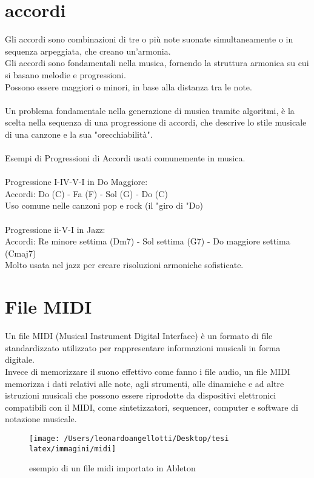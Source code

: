 \documentclass[a4paper,12pt]{report}
\begin{document}
\section{accordi}

Gli accordi sono combinazioni di tre o più note suonate simultaneamente o in sequenza arpeggiata, che creano un'armonia. \\
Gli accordi sono fondamentali nella musica, fornendo la struttura armonica su cui si basano melodie e progressioni. \\
Possono essere maggiori o minori, in base alla distanza tra le note. \\
\\
Un problema fondamentale nella generazione di musica tramite algoritmi, è la scelta nella sequenza di una progressione di accordi, che descrive lo stile musicale di una canzone e la sua "orecchiabilità". \\
\\
Esempi di Progressioni di Accordi usati comunemente in musica.\\
\\
Progressione I-IV-V-I in Do Maggiore: \\
Accordi: Do (C) - Fa (F) - Sol (G) - Do (C) \\
Uso comune nelle canzoni pop e rock (il "giro di "Do) \\
\\
Progressione ii-V-I in Jazz: \\
Accordi: Re minore settima (Dm7) - Sol settima (G7) - Do maggiore settima (Cmaj7) \\
Molto usata nel jazz per creare risoluzioni armoniche sofisticate.

\section{File MIDI}

Un file MIDI (Musical Instrument Digital Interface) è un formato di file standardizzato utilizzato per rappresentare informazioni musicali in forma digitale. \\
Invece di memorizzare il suono effettivo come fanno i file audio, un file MIDI memorizza i dati relativi alle note, agli strumenti, alle dinamiche e ad altre istruzioni musicali che possono essere riprodotte da dispositivi elettronici compatibili con il MIDI, come sintetizzatori, sequencer, computer e software di notazione musicale.

\begin{figure}[h!]
    \centering
    \texttt{[image: /Users/leonardoangellotti/Desktop/tesi latex/immagini/midi]} 
    \caption{esempio di un file midi importato in Ableton}
    \label{fig:immagine}
\end{figure}
\end{document}
